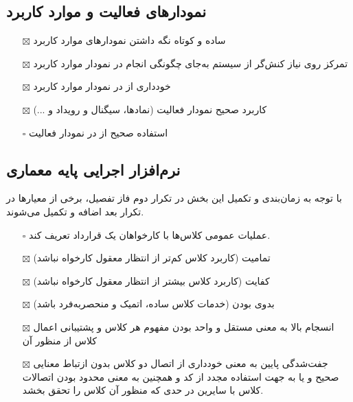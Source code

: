 \subsection{نمودارهای فعالیت و موارد کاربرد}

\begin{itemize}
	\item[$\boxtimes$]
	ساده و کوتاه نگه داشتن نمودارهای موارد کاربرد
	\item[$\boxtimes$]
	تمرکز روی نیاز کنش‌گر از سیستم به‌جای چگونگی انجام در نمودار موارد کاربرد
	\item[$\boxtimes$]
	خودداری از  در نمودار موارد کاربرد
	\item[$\boxtimes$]
	کاربرد صحیح  نمودار فعالیت (نمادها، سیگنال و رویداد و ...)
	\item[$\square$]
	استفاده صحیح از  در نمودار فعالیت
	
\end{itemize}

\subsection{نرم‌افزار اجرایی پایه معماری}
با توجه به زمان‌بندی و تکمیل این بخش در تکرار دوم فاز تفصیل، برخی از معیارها در تکرار بعد اضافه و تکمیل می‌شوند.
\begin{itemize}
	\item[$\square$]
	عملیات عمومی کلاس‌ها با کارخواهان یک قرارداد تعریف کند.
	\item[$\boxtimes$]
	تمامیت (کاربرد کلاس کم‌تر از انتظار معقول کارخواه نباشد)
	\item[$\boxtimes$]
	کفایت (کاربرد کلاس بیشتر از انتظار معقول کارخواه نباشد)
	\item[$\boxtimes$]
	بدوی بودن (خدمات کلاس ساده، اتمیک و منحصربه‌فرد باشد)
	\item[$\boxtimes$]
	انسجام بالا به معنی مستقل و واحد بودن مفهوم هر کلاس و پشتیبانی اعمال کلاس از منظور آن
	\item[$\boxtimes$]
	جفت‌شدگی پایین به معنی خودداری از اتصال دو کلاس بدون ازتباط معنایی صحیح و یا به جهت استفاده مجدد از کد و همچنین به معنی محدود بودن اتصالات کلاس با سایرین در حدی که منظور آن کلاس را تحقق بخشد.
\end{itemize}
